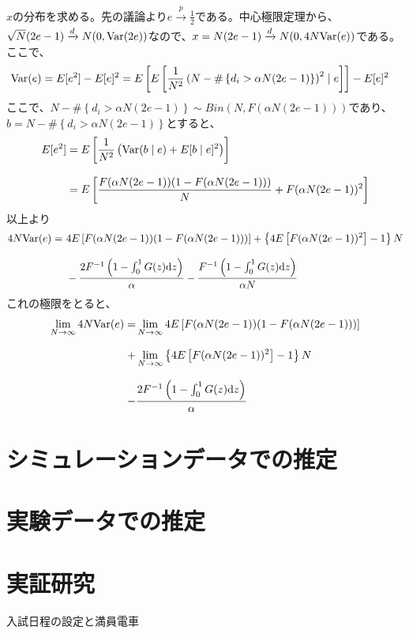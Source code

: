 \documentclass{jsarticle}
\begin{document}
$x$の分布を求める。先の議論より$e \xrightarrow[]{p} \frac{1}{2}$である。中心極限定理から、$\sqrt{N}(2e - 1) \xrightarrow[]{d} N(0, {\rm Var}(2e))$なので、$x = N(2e - 1) \xrightarrow[]{d} N(0, 4N{\rm Var}(e))$である。ここで、
\begin{align*}
	{\rm Var}(e) &= E[e^2] - E[e]^2 = E\left[ E\left[ \frac{1}{N^2} \left( N - \# \left\{ d_i > \alpha N (2e-1) \right\} \right)^2 \mid e \right] \right] - E[e]^2
\end{align*}
ここで、$N - \# \left\{ d_i > \alpha N (2e-1) \right\} \sim Bin(N, F(\alpha N (2e-1)))$であり、$b = N - \# \left\{ d_i > \alpha N (2e-1) \right\}$とすると、
\begin{align*}
	E[e^2] &= E\left[ \frac{1}{N^2} \left( {\rm Var}(b \mid e) + E[b \mid e]^2 \right) \right]\\[8pt]
	&= E\left[ \frac{F(\alpha N (2e-1)) (1 - F(\alpha N (2e-1)))}{N} + F(\alpha N (2e-1))^2 \right]
\end{align*}
以上より
\begin{align*}
	4N{\rm Var}(e) =\ &4E\left[F(\alpha N (2e-1)) (1 - F(\alpha N (2e-1)))\right] + \left\{ 4E\left[ F(\alpha N (2e-1))^2 \right]- 1\right\}N\\[8pt]
	& - \frac{2F^{-1}\left( 1 - \int_0^1 G(z) \mathrm{d}z \right)}{\alpha} - \frac{F^{-1}\left( 1 - \int_0^1 G(z) \mathrm{d}z \right)}{\alpha N}
\end{align*}
これの極限をとると、
\begin{align*}
	\lim_{N \to \infty} 4N{\rm Var}(e) = &\lim_{N \to \infty} 4E\left[F(\alpha N (2e-1)) (1 - F(\alpha N (2e-1)))\right]\\[8pt]
	 + &\lim_{N \to \infty} \left\{ 4E\left[ F(\alpha N (2e-1))^2 \right]- 1\right\}N\\[8pt]
	  - &\frac{2F^{-1}\left( 1 - \int_0^1 G(z) \mathrm{d}z \right)}{\alpha}
\end{align*}

\section{シミュレーションデータでの推定}

\section{実験データでの推定}

\section{実証研究}
入試日程の設定と満員電車
\end{document}
